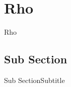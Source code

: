 \section{Rho}
\begin{frame}{Rho}

\end{frame}

\subsection{Sub Section}
\begin{frame}{Sub Section}{Subtitle}

\end{frame}